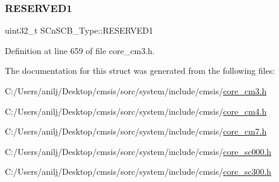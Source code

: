 \subsubsection{\texorpdfstring{R\+E\+S\+E\+R\+V\+E\+D1}{RESERVED1}}
{\footnotesize\ttfamily uint32\+\_\+t S\+Cn\+S\+C\+B\+\_\+\+Type\+::\+R\+E\+S\+E\+R\+V\+E\+D1}



Definition at line 659 of file core\+\_\+cm3.\+h.



The documentation for this struct was generated from the following files\+:\begin{DoxyCompactItemize}
\item 
C\+:/\+Users/anilj/\+Desktop/cmsis/sorc/system/include/cmsis/\hyperlink{core__cm3_8h}{core\+\_\+cm3.\+h}\item 
C\+:/\+Users/anilj/\+Desktop/cmsis/sorc/system/include/cmsis/\hyperlink{core__cm4_8h}{core\+\_\+cm4.\+h}\item 
C\+:/\+Users/anilj/\+Desktop/cmsis/sorc/system/include/cmsis/\hyperlink{core__cm7_8h}{core\+\_\+cm7.\+h}\item 
C\+:/\+Users/anilj/\+Desktop/cmsis/sorc/system/include/cmsis/\hyperlink{core__sc000_8h}{core\+\_\+sc000.\+h}\item 
C\+:/\+Users/anilj/\+Desktop/cmsis/sorc/system/include/cmsis/\hyperlink{core__sc300_8h}{core\+\_\+sc300.\+h}\end{DoxyCompactItemize}
